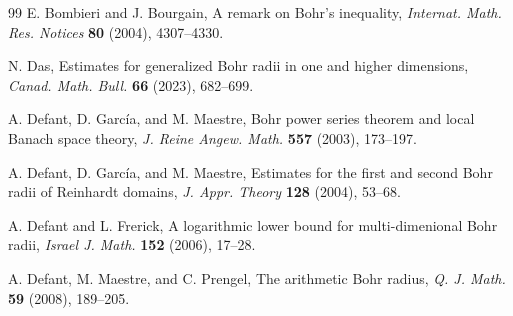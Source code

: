\documentclass[a4paper,12pt]{amsart}
\theoremstyle{definition}
\begin{document}
\begin{thebibliography}{99}
	 {\sc E. Bombieri} and {\sc J. Bourgain}, A remark on Bohr's inequality, {\it Internat. Math. Res. Notices} {\bf 80} (2004), 4307--4330.
	
	
	
	
	
	
	 {\sc N. Das}, Estimates for generalized Bohr radii in one and higher dimensions, {\it Canad. Math. Bull.} {\bf 66} (2023), 682--699.
	
	 {\sc A. Defant, D. Garc\'{i}a}, and {\sc  M. Maestre}, Bohr power series theorem and local Banach space theory, {\it J. Reine Angew. Math.} {\bf 557} (2003), 173--197.
	
	 {\sc A. Defant, D. Garc\'{i}a}, and {\sc  M. Maestre}, Estimates for the first and second Bohr radii of Reinhardt domains, {\it J. Appr. Theory} {\bf 128} (2004), 53--68.
	
	 {\sc A. Defant} and {\sc L. Frerick}, A logarithmic lower bound for multi-dimenional Bohr radii, {\it Israel J. Math.} {\bf 152} (2006), 17--28.
	
	 {\sc A. Defant,  M. Maestre}, and {\sc  C. Prengel}, The arithmetic Bohr radius, {\it Q. J. Math.} {\bf 59} (2008), 189--205.
	
	
	

\end{thebibliography}
\end{document}
